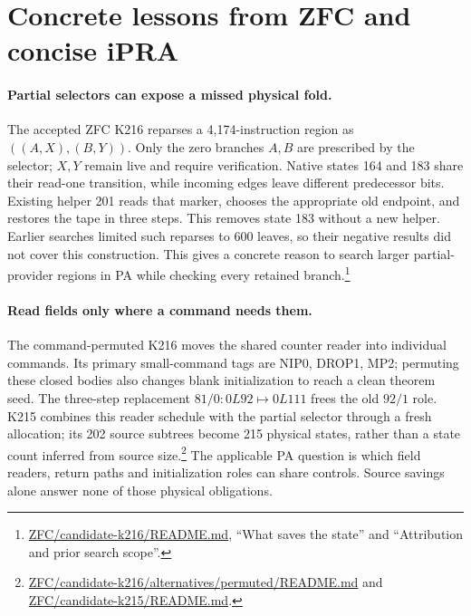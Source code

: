 \section{Concrete lessons from ZFC and concise iPRA}

\paragraph{Partial selectors can expose a missed physical fold.}
The accepted ZFC K216 reparses a 4,174-instruction region as
$((A,X),(B,Y))$. Only the zero branches $A,B$ are prescribed by the
selector; $X,Y$ remain live and require verification. Native states 164
and 183 share their read-one transition, while incoming edges leave
different predecessor bits. Existing helper 201 reads that marker,
chooses the appropriate old endpoint, and restores the tape in three
steps. This removes state 183 without a new helper. Earlier searches
limited such reparses to 600 leaves, so their negative results did not
cover this construction. This gives a concrete reason to search larger
partial-provider regions in PA while checking every retained branch.\footnote{\href{https://github.com/VladimirReshetnikov/ProveIt/blob/4be5c6e3a10292a7466f5d3687e3b39615ff049b/Computability/BusyBeaver/Research/ZFC/candidate-k216/README.md}{ZFC/candidate-k216/README.md}, ``What saves the state'' and ``Attribution and prior search scope''.}

\paragraph{Read fields only where a command needs them.}
The command-permuted K216 moves the shared counter reader into individual
commands. Its primary small-command tags are NIP0, DROP1, MP2;
permuting these closed bodies also changes blank initialization to reach
a clean theorem seed. The three-step replacement
$81/0:0L92\mapsto0L111$ frees the old $92/1$ role. K215 combines this
reader schedule with the partial selector through a fresh allocation;
its 202 source subtrees become 215 physical states, rather than a state
count inferred from source size.\footnote{\href{https://github.com/VladimirReshetnikov/ProveIt/blob/4be5c6e3a10292a7466f5d3687e3b39615ff049b/Computability/BusyBeaver/Research/ZFC/candidate-k216/alternatives/permuted/README.md}{ZFC/candidate-k216/alternatives/permuted/README.md} and \href{https://github.com/VladimirReshetnikov/ProveIt/blob/4be5c6e3a10292a7466f5d3687e3b39615ff049b/Computability/BusyBeaver/Research/ZFC/candidate-k215/README.md}{ZFC/candidate-k215/README.md}.}
The applicable PA question is which field readers, return paths and
initialization roles can share controls. Source savings alone answer
none of those physical obligations.

